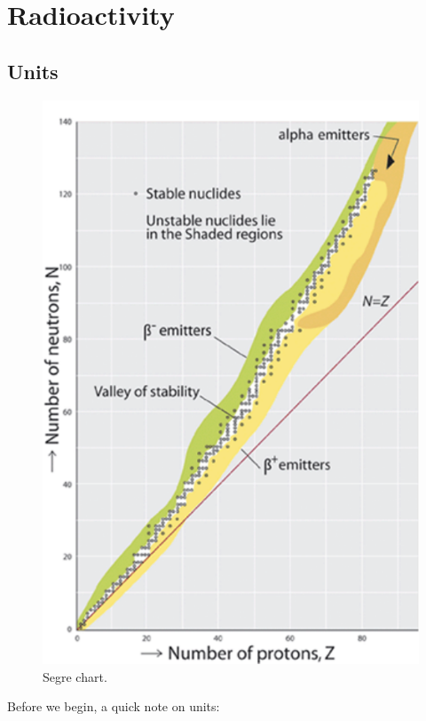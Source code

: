 \chapter{Radioactivity}

\section{Units}

\begin{figure}[h!]
\centering
\includegraphics[width=0.6\columnwidth]{plots/stability.pdf}
\caption{\label{fig:stability} Segre chart.}
\end{figure}

Before we begin, a quick note on units: 

